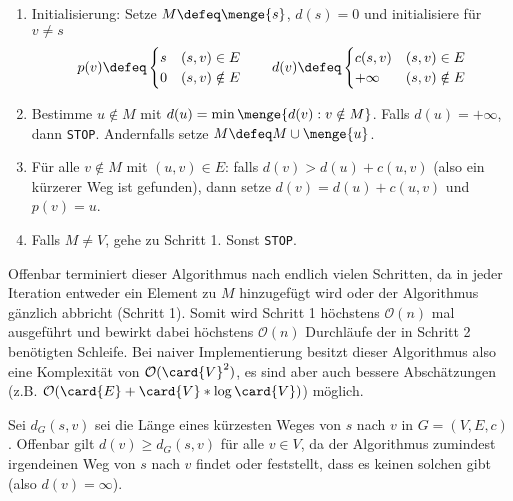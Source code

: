 \begin{enumerate}[label=Schritt \arabic*:, leftmargin=*, start=0]
	\item Initialisierung: Setze $M \defeq \menge{s}$, $d(s) = 0$ und initialisiere für $v \neq s$
	\begin{equation*}
		p(v) \defeq \begin{cases}
		s & (s,v) \in E \\ 0 & (s,v) \notin E
		\end{cases} 
		\qquad
		d(v) \defeq \begin{cases}
		c(s,v) & (s,v) \in E \\ +\infty &(s,v) \notin E
		\end{cases}
	\end{equation*}
	\item Bestimme $u \notin M$ mit $d(u) = \min\menge{d(v) : v \notin M}$. Falls $d(u) = +\infty$, dann \texttt{STOP}. Andernfalls setze $M \defeq M \cup \menge{u}$.
	\item Für alle $v \notin M$ mit $(u,v) \in E$: falls $d(v) > d(u) + c(u,v)$ (also ein kürzerer Weg ist gefunden), dann setze $d(v) = d(u) + c(u,v)$ und $p(v) = u$.
	\item Falls $M \neq V$, gehe zu Schritt 1. Sonst \texttt{STOP}.
\end{enumerate}

Offenbar terminiert dieser Algorithmus nach endlich vielen Schritten, da in jeder Iteration entweder ein Element zu $M$ hinzugefügt wird oder der Algorithmus gänzlich abbricht (Schritt 1). Somit wird Schritt 1 höchstens $\mathcal{O}(n)$ mal ausgeführt und bewirkt dabei höchstens $\mathcal{O}(n)$ Durchläufe der in Schritt 2 benötigten Schleife. Bei naiver Implementierung besitzt dieser Algorithmus also eine Komplexität von $\mathcal{O}(\card{V}^2)$, es sind aber auch bessere Abschätzungen (z.B. $\mathcal{O}(\card{E} + \card{V} * \log\card{V})$) möglich.

Sei $d_G(s,v)$ sei die Länge eines kürzesten Weges von $s$ nach $v$ in $G= (V,E,c)$. Offenbar gilt $d(v) \ge d_G(s,v)$ für alle $v \in V$, da der Algorithmus zumindest irgendeinen Weg von $s$ nach $v$ findet oder feststellt, dass es keinen solchen gibt (also $d(v) = \infty$).

